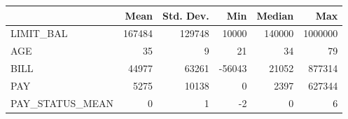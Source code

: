 \begin{tabular}{lrrrrr}
\toprule
 & Mean & Std. Dev. & Min & Median & Max \\
\midrule
LIMIT_BAL & 167484 & 129748 & 10000 & 140000 & 1000000 \\
AGE & 35 & 9 & 21 & 34 & 79 \\
BILL & 44977 & 63261 & -56043 & 21052 & 877314 \\
PAY & 5275 & 10138 & 0 & 2397 & 627344 \\
PAY_STATUS_MEAN & 0 & 1 & -2 & 0 & 6 \\
\bottomrule
\end{tabular}
